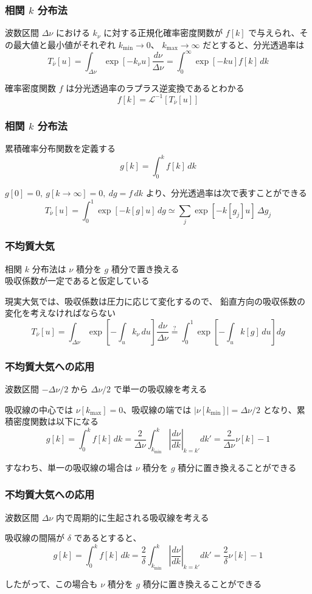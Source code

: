 \documentclass[unicode,colorlinks]{beamer}
\begin{document}
\begin{frame}
	\frametitle{相関 $k$ 分布法}
	波数区間 $\Delta\nu$ における $k_\nu$ に対する正規化確率密度関数が
	$f[k]$ で与えられ、その最大値と最小値がそれぞれ $k_{\mathrm{min}}\to0$、
	$k_{\mathrm{max}}\to\infty$ だとすると、分光透過率は
	\[T_{\bar\nu}[u]=\int_{\Delta\nu}\exp[-k_\nu u]\frac{d\nu}{\Delta\nu}=\int^\infty_0 \exp[-ku]f[k]\,dk\]

	確率密度関数 $f$ は分光透過率のラプラス逆変換であるとわかる
	\[f[k]=\mathcal{L}^{-1}[T_{\bar\nu}[u]]\]
\end{frame}

\begin{frame}
	\frametitle{相関 $k$ 分布法}
	累積確率分布関数を定義する
	\[g[k]=\int^k_0 f[k]\,dk\]

	$g[0]=0,\ g[k\to\infty]=0,\ dg=f\,dk$ より、分光透過率は次で表すことができる
	\[T_{\bar\nu}[u]=\int^1_0 \exp[-k[g]u]\,dg\simeq\sum_j\exp[-k[g_j]u]\,\Delta g_j\]
\end{frame}

\begin{frame}
	\frametitle{不均質大気}
	相関 $k$ 分布法は $\nu$ 積分を $g$ 積分で置き換える\\
	吸収係数が一定であると仮定している

	現実大気では、吸収係数は圧力に応じて変化するので、
	鉛直方向の吸収係数の変化を考えなければならない
	\[
		T_{\bar\nu}[u]
		=\int_{\Delta\nu}\exp\left[-\int_u k_\nu\,du\right]\frac{d\nu}{\Delta\nu}
		\stackrel{?}{=}\int^1_0\exp\left[-\int_uk[g]\,du\right]dg
	\]
\end{frame}

\begin{frame}
	\frametitle{不均質大気への応用}
	波数区間 $-\Delta\nu/2$ から $\Delta\nu/2$ で単一の吸収線を考える

	吸収線の中心では $\nu[k_{\mathrm{max}}]=0$、吸収線の端では
	$|\nu[k_{\mathrm{min}}]|=\Delta\nu/2$ となり、累積密度関数は以下になる
	\[
		g[k]=\int^k_0 f[k]\,dk
		=\frac{2}{\Delta\nu}\int^k_{k_{\mathrm{min}}}\left|\frac{d\nu}{dk}\right|_{k=k'}dk'
		=\frac{2}{\Delta\nu}\nu[k]-1
	\]

	すなわち、単一の吸収線の場合は $\nu$ 積分を $g$ 積分に置き換えることができる
\end{frame}

\begin{frame}
	\frametitle{不均質大気への応用}
	波数区間 $\Delta\nu$ 内で周期的に生起される吸収線を考える

	吸収線の間隔が $\delta$ であるとすると、
	\[
		g[k]=\int^k_0 f[k]\,dk
		=\frac{2}{\delta}\int^k_{k_{\mathrm{min}}}\left|\frac{d\nu}{dk}\right|_{k=k'}dk'
		=\frac{2}{\delta}\nu[k]-1
	\]

	したがって、この場合も $\nu$ 積分を $g$ 積分に置き換えることができる
\end{frame}
\end{document}
